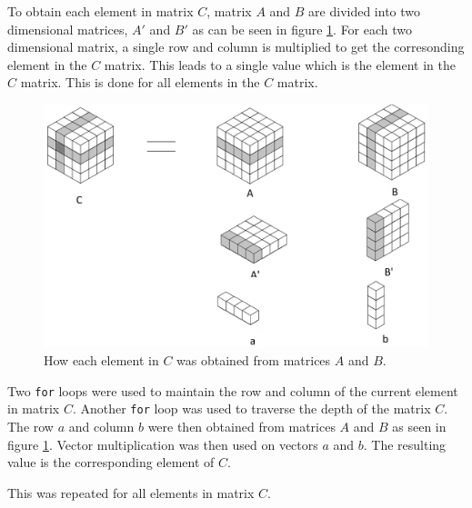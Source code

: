\documentclass[a4paper,10pt]{article}
\begin{document}
To obtain each element in matrix $C$, matrix $A$ and $B$ are divided into two dimensional matrices, $A'$ and $B'$ as can be seen in figure \ref{3DMult}.
For each two dimensional matrix, a single row and column is multiplied to get the corresonding element in the $C$ matrix.
This leads to a single value which is the element in the $C$ matrix.
This is done for all elements in the $C$ matrix.

\begin{figure}[h]
\centering
\includegraphics[scale=0.15]{3D.jpg}
\caption{How each element in $C$ was obtained from matrices $A$ and $B$.}\label{3DMult}
\end{figure}

Two \texttt{for} loops were used to maintain the row and column of the current element in matrix $C$.
Another \texttt{for} loop was used to traverse the depth of the matrix $C$.
The row $a$ and column $b$ were then obtained from matrices $A$ and $B$ as seen in figure \ref{3DMult}.
Vector multiplication was then used on vectors $a$ and $b$.
The resulting value is the corresponding element of $C$.

This was repeated for all elements in matrix $C$.

\end{document}
